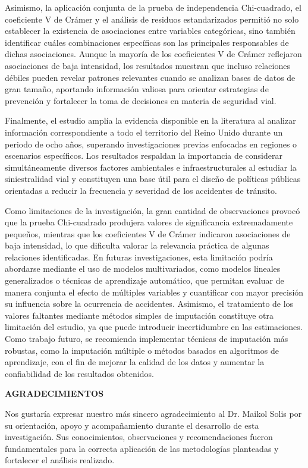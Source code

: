\documentclass[11pt]{article}
\newcommand{\seccion}[1]{%
  \vspace{1.2em}
  \begin{center}\textbf{#1}\end{center}
  \vspace{0.3em}
}
\begin{document}
Asimismo, la aplicación conjunta de la prueba de independencia Chi-cuadrado, el coeficiente V de Crámer y el análisis de residuos estandarizados permitió no solo establecer la existencia de asociaciones entre variables categóricas, sino también identificar cuáles combinaciones específicas son las principales responsables de dichas asociaciones. Aunque la mayoría de los coeficientes V de Crámer reflejaron asociaciones de baja intensidad, los resultados muestran que incluso relaciones débiles pueden revelar patrones relevantes cuando se analizan bases de datos de gran tamaño, aportando información valiosa para orientar estrategias de prevención y fortalecer la toma de decisiones en materia de seguridad vial.

Finalmente, el estudio amplía la evidencia disponible en la literatura al analizar información correspondiente a todo el territorio del Reino Unido durante un periodo de ocho años, superando investigaciones previas enfocadas en regiones o escenarios específicos. Los resultados respaldan la importancia de considerar simultáneamente diversos factores ambientales e infraestructurales al estudiar la siniestralidad vial y constituyen una base útil para el diseño de políticas públicas orientadas a reducir la frecuencia y severidad de los accidentes de tránsito.

Como limitaciones de la investigación, la gran cantidad de observaciones provocó que la prueba Chi-cuadrado produjera valores de significancia extremadamente pequeños, mientras que los coeficientes V de Crámer indicaron asociaciones de baja intensidad, lo que dificulta valorar la relevancia práctica de algunas relaciones identificadas. En futuras investigaciones, esta limitación podría abordarse mediante el uso de modelos multivariados, como modelos lineales generalizados o técnicas de aprendizaje automático, que permitan evaluar de manera conjunta el efecto de múltiples variables y cuantificar con mayor precisión su influencia sobre la ocurrencia de accidentes. Asimismo, el tratamiento de los valores faltantes mediante métodos simples de imputación constituye otra limitación del estudio, ya que puede introducir incertidumbre en las estimaciones. Como trabajo futuro, se recomienda implementar técnicas de imputación más robustas, como la imputación múltiple o métodos basados en algoritmos de aprendizaje, con el fin de mejorar la calidad de los datos y aumentar la confiabilidad de los resultados obtenidos.

\seccion{AGRADECIMIENTOS}

 Nos gustaría expresar nuestro más sincero agradecimiento al Dr. Maikol Solis por su orientación, apoyo y acompañamiento durante el desarrollo de esta investigación. Sus conocimientos, observaciones y recomendaciones fueron fundamentales para la correcta aplicación de las metodologías planteadas y fortalecer el análisis realizado.
\end{document}
